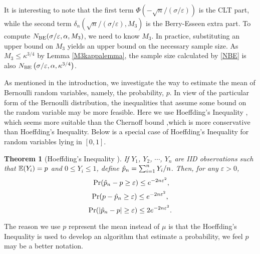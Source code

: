 \documentclass{iitthesis}
\newtheorem{theorem}{Theorem}[section]
\theoremstyle{definition}
\begin{document}
It is interesting to note that the first term $\Phi\left(-\sqrt{n}/(\sigma /\varepsilon) \right)$ is the CLT part, while the second term $\delta_n\left(\sqrt{n}/(\sigma /\varepsilon),M_3\right)$ is the Berry-Esseen extra part. To compute $N_{\operatorname{BE}}(\sigma /\varepsilon,\alpha,M_3)$, we need to know $M_3$. In practice, substituting an upper bound on $M_3$ yields an upper bound on the necessary sample size.
As $M_3 \leq \kappa^{3/4}$ by Lemma \ref{M3kappalemma}, the sample size calculated by \eqref{NBE} is also $N_{\operatorname{BE}}\left(\sigma /\varepsilon,\alpha,\kappa^{3/4}\right) $.


As mentioned in the introduction, we investigate the way to estimate the mean of Bernoulli random variables, namely, the probability, $p$. In view of the particular form of the Bernoulli distribution, the inequalities that assume some bound on the random variable may be more feasible.  Here we use Hoeffding's Inequality \cite{H63}, which seems more suitable than the Chernoff bound \cite{Chernoff52},which is more conservative than Hoeffding's Inequality.  Below is a special case of Hoeffding's Inequality for random variables lying in $[0,1]$.
\begin{theorem}[Hoeffding's Inequality {\cite{H63}}] \label{hoeff}
If $Y_1$, $Y_2$, $\cdots$, $Y_n$ are IID observations such that $\mathbb{E}(Y_i)=p$ and $0 \leq Y_i \leq 1$, define $\hat{p}_n=\sum_{i=1}^n Y_i/n$. Then, for any $\varepsilon>0$, 
\begin{equation}\label{ineq:HoeffonesideB}\
\Pr(\hat{p}_n-p \geq \varepsilon) \leq e^{-2n\varepsilon^2},
\end{equation}
\begin{equation}\label{ineq:HoeffonesideA}
\Pr(p-\hat{p}_n \geq \varepsilon) \leq e^{-2n\varepsilon^2},
\end{equation}
\begin{equation}\label{ineq:Hoefftwoside}
\Pr(\left \lvert \hat{p}_n-p \right \rvert \geq \varepsilon) \leq 2e^{-2n\varepsilon^2}.
\end{equation}
\end{theorem}
The reason we use $p$ represent the mean instead of $\mu$ is that the Hoeffding's Inequality is used to develop an algorithm that estimate a probability, we feel $p$ may be a better notation.
 
\end{document}

